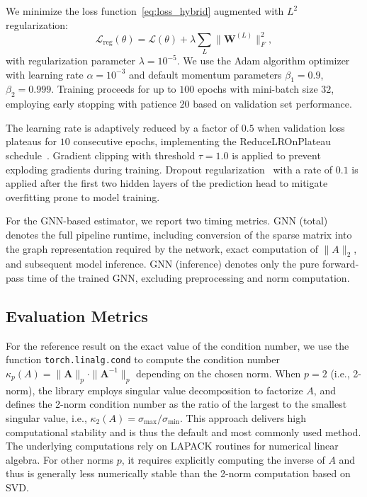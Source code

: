 \documentclass[11pt,a4paper]{article}
\theoremstyle{plain}
\theoremstyle{definition}
\theoremstyle{remark}
\begin{document}
We minimize the loss function~\eqref{eq:loss_hybrid} augmented with $L^2$ regularization:
\begin{equation*}\label{eq:reg_loss}
\mathcal{L}_\text{reg}(\theta) = \mathcal{L}(\theta) + \lambda \sum_{L} \|\mathbf{W}^{(L)}\|_F^2,
\end{equation*}
with regularization parameter $\lambda = 10^{-5}$. We use the Adam algorithm optimizer~\cite{kingma2015adam} with learning rate $\alpha = 10^{-3}$ and default momentum parameters $\beta_1 = 0.9$, $\beta_2 = 0.999$. Training proceeds for up to $100$ epochs with mini-batch size $32$, employing early stopping with patience $20$ based on validation set performance.

The learning rate is adaptively reduced by a factor of $0.5$ when validation loss plateaus for $10$ consecutive epochs, implementing the ReduceLROnPlateau schedule~\cite{paszke2019pytorch}. Gradient clipping with threshold $\tau = 1.0$ is applied to prevent exploding gradients during training. Dropout regularization~\cite{srivastava2014dropout} with a rate of $0.1$ is applied after the first two hidden layers of the prediction head to mitigate overfitting prone to model training.


For the GNN-based estimator, we report two timing metrics.
GNN (total) denotes the full pipeline runtime, including conversion of the sparse matrix into the graph representation required by the network, exact computation of $\|A\|_2$, and subsequent model inference.
GNN (inference) denotes only the pure forward-pass time of the trained GNN, excluding preprocessing and norm computation.


\subsection{Evaluation Metrics}
For the reference result on the exact value of the condition number, we use the function \texttt{torch.linalg.cond} to compute the condition number $\kappa_p(A) = \|\mathbf{A}\|_p \cdot \|\mathbf{A}^{-1}\|_p$ depending on the chosen norm. When $p=2$ (i.e., 2-norm), the library employs singular value decomposition to factorize $A$, and defines the 2-norm condition number as the ratio of the largest to the smallest singular value, i.e., $\kappa_2(A) = \sigma_{\max} / \sigma_{\min}$. This approach delivers high computational stability and is thus the default and most commonly used method. The underlying computations rely on LAPACK routines for numerical linear algebra. For other norms $p$, it requires explicitly computing the inverse of $A$ and thus is generally less numerically stable than the 2-norm computation based on SVD.
\end{document}
